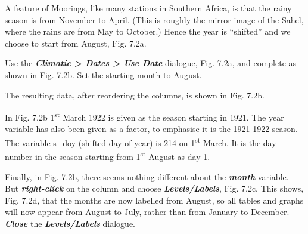 \documentclass[
  letterpaper,
  DIV=11,
  numbers=noendperiod]{scrreprt}
\begin{document}
A feature of Moorings, like many stations in Southern Africa, is that
the rainy season is from November to April. (This is roughly the mirror
image of the Sahel, where the rains are from May to October.) Hence the
year is ``shifted'' and we choose to start from August, Fig. 7.2a.

Use the \textbf{\emph{Climatic \textgreater{} Dates \textgreater{} Use
Date}} dialogue, Fig. 7.2a, and complete as shown in Fig. 7.2b. Set the
starting month to August.

The resulting data, after reordering the columns, is shown in Fig. 7.2b.

In Fig. 7.2b 1\textsuperscript{st} March 1922 is given as the season
starting in 1921. The year variable has also been given as a factor, to
emphasise it is the 1921-1922 season. The variable s\_doy (shifted day
of year) is 214 on 1\textsuperscript{st} March. It is the day number in
the season starting from 1\textsuperscript{st} August as day 1.

Finally, in Fig. 7.2b, there seems nothing different about the
\textbf{\emph{month}} variable. But \textbf{\emph{right-click}} on the
column and choose \textbf{\emph{Levels/Labels}}, Fig. 7.2c. This shows,
Fig. 7.2d, that the months are now labelled from August, so all tables
and graphs will now appear from August to July, rather than from January
to December. \textbf{\emph{Close}} the \textbf{\emph{Levels/Labels}}
dialogue.
\end{document}
